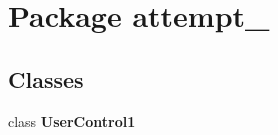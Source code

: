 \section{Package attempt\_}
\label{namespaceattempt__7}
\subsection*{Classes}
\begin{DoxyCompactItemize}
\item 
class {\bf UserControl1}
\end{DoxyCompactItemize}
